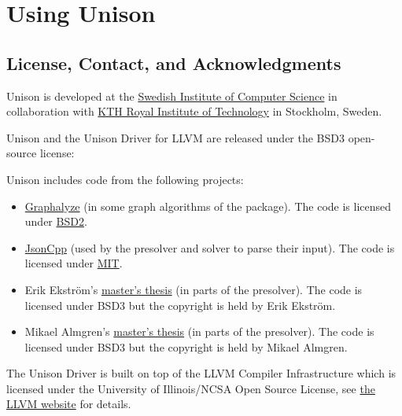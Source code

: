 \documentclass[11pt]{report}
\newenvironment{colorBox}[1]
 {\begin{tcolorbox}[
    breakable,
    colback=#1,
    colframe=white,
    boxrule=0pt
  ]}
 {\end{tcolorbox}}
\newenvironment{codeBox}
 {\begin{colorBox}{bgcolor4!20}}
 {\end{colorBox}}
\begin{document}
\part{Using Unison}
\label{part:using-unison}

\chapter{License, Contact, and Acknowledgments}%
\label{sec:license-contact-and-acknowledgments}

Unison is developed at the \href{https://www.sics.se/}{Swedish Institute of
  Computer Science} in collaboration with \href{https://www.kth.se/en}{KTH Royal
  Institute of Technology} in Stockholm, Sweden.

Unison and the Unison Driver for LLVM are released under the BSD3 open-source
license:

\begin{codeBox}
\end{codeBox}

Unison includes code from the following projects:

\begin{itemize}
\item \href{https://hackage.haskell.org/package/Graphalyze}{Graphalyze} (in some
  graph algorithms of the  package).
  The code is licensed under
  \href{https://hackage.haskell.org/package/Graphalyze/src/LICENSE}{BSD2}.

\item \href{https://github.com/open-source-parsers/jsoncpp}{JsonCpp} (used
  by the presolver and solver to parse their input).
  The code is licensed under
  \href{https://github.com/open-source-parsers/jsoncpp/blob/master/LICENSE}{MIT}.

\item Erik Ekström's
  \href{https://www.sics.se/\%7ercas/teaching/ErikEkstrom_2015.pdf}{master's
    thesis} (in parts of the presolver).
  The code is licensed under BSD3 but the copyright is held by Erik Ekström.

\item Mikael Almgren's
  \href{https://www.sics.se/\%7ercas/teaching/MikaelAlmgren_2015.pdf}{master's
    thesis} (in parts of the presolver).
  The code is licensed under BSD3 but the copyright is held by Mikael Almgren.
\end{itemize}

The Unison Driver is built on top of the LLVM Compiler Infrastructure which is
licensed under the University of Illinois/NCSA Open Source License, see
\href{http://llvm.org/}{the LLVM website} for details.
\end{document}
